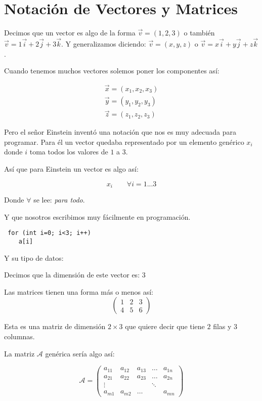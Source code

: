 \section*{Notación de Vectores y Matrices}

Decimos que un vector es algo de la forma $\vec{v} = (1, 2, 3)$ o también $ \vec{v} = 1 \vec{i} + 2 \vec{j} + 3 \vec{k} $.
Y generalizamos diciendo: $\vec{v} = (x, y, z)$ o $ \vec{v} = x \vec{i} + y \vec{j} + z \vec{k} $.

Cuando tenemos muchos vectores solemos poner los componentes así:

\begin{gather*}
\vec{x} = (x_1, x_2,  x_3) \\
\vec{y} = (y_1, y_2,  y_3) \\
\vec{z} = (z_1, z_2,  z_3)
\end{gather*}

Pero el señor Einstein inventó una notación que nos es muy
adecuada para programar. Para él un vector quedaba representado
por un elemento genérico $ x_i $ donde $i$ toma todos los valores
de $1$ a $3$.

Así que para Einstein un vector es algo así:

$$ x_i \qquad \forall i=1 ... 3 $$

Donde $ \forall$ se lee: \emph{para todo}.

Y que nosotros escribimos muy fácilmente en programación.

\begin{lstlisting}
 for (int i=0; i<3; i++)
    a[i]
\end{lstlisting}

Y su tipo de datos: 

Decimos que la dimensión de este vector es: $3$

Las matrices tienen una forma más o menos así:
$$
\begin{pmatrix}
 1 & 2 & 3\\
 4 & 5 & 6
\end{pmatrix}
$$

Esta es una matriz de dimensión $2 \times 3$ que quiere
decir que tiene $2$ filas y $3$ columnas.

La matriz $ \mathcal{A} $ genérica sería algo así:

$$
\mathcal{A} = 
\begin{pmatrix}
 a_{11} & a_{12} & a_{13} & \dots  & a_{1n} \\
 a_{21} & a_{22} & a_{23} & \dots  & a_{2n} \\
 \vdots &        &        & \ddots & \\
 a_{m1} & a_{m2} & \dots  &        & a_{mn} 
\end{pmatrix}
$$

